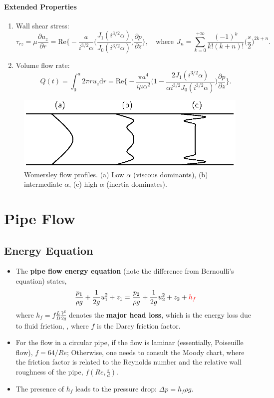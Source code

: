 \documentclass[a4paper]{article}
\begin{document}
\paragraph{Extended Properties}
\begin{enumerate}
    \item  Wall shear stress: 
    \[
        \tau_{rz} = \mu \frac{\partial u_{z}}{\partial r} = \mathrm{Re}\bigg\{ -\frac{a}{i^{3/2}\alpha} \bigg( \frac{J_{1}(i^{3/2}\alpha)}{J_{0}(i^{3/2}\alpha)} \bigg) \frac{\partial p}{\partial z} \bigg\}, \quad 
        \text{where} \ \ J_n = \sum_{k=0}^{+\infty} \frac{(-1)^k}{k!(k+n)!} \bigg(\frac{s}{2}\bigg)^{2k+n}.
    \]

    \item Volume flow rate: 
    \[
        Q(t) = \int_{0}^{a} 2\pi r u_{z} \mathrm{d}r = \mathrm{Re}\bigg\{ -\frac{\pi a^{4}}{i \mu \alpha^{2}} \bigg( 1 - \frac{2J_{1}(i^{3/2}\alpha)}{\alpha i^{3/2} J_{0}(i^{3/2}\alpha)} \bigg) \frac{\partial p}{\partial z} \bigg\}.
    \]
\end{enumerate}

\begin{figure}[H]
    \centering
    \includegraphics[width=.4\textwidth]{img/wo_plot.eps}
    \caption{Womersley flow profiles. (a) Low $\alpha$ (viscous dominants), (b) intermediate $\alpha$, (c) high $\alpha$ (inertia dominates).}
\end{figure}

\section{Pipe Flow}

\subsection{Energy Equation}
\begin{itemize}
    \item The \textbf{pipe flow energy equation} (note the difference from Bernoulli's equation) states,
    \[
        \frac{p_1}{\rho g} + \frac{1}{2g}u_1^2 + z_1 = \frac{p_2}{\rho g} + \frac{1}{2g}u_2^2 + z_2 + {\color{red} h_f}
    \]
    where $\displaystyle h_{f} = f\frac{L}{D}\frac{V^{2}}{2g}$ denotes the \textbf{major head loss}, which is the energy loss due to fluid friction, , where $f$ is the Darcy friction factor. 
    
    \item For the flow in a circular pipe, if the flow is laminar (essentially, Poiseuille flow), $f = 64/Re$; Otherwise, one needs to consult the Moody chart, where the friction factor is related to the Reynolds number and the relative wall roughness of the pipe, $f(Re, \frac{\varepsilon}{d})$.
    
    \item The presence of $h_f$ leads to the pressure drop: $\Delta p = h_f \rho g$.
\end{itemize}
\end{document}
